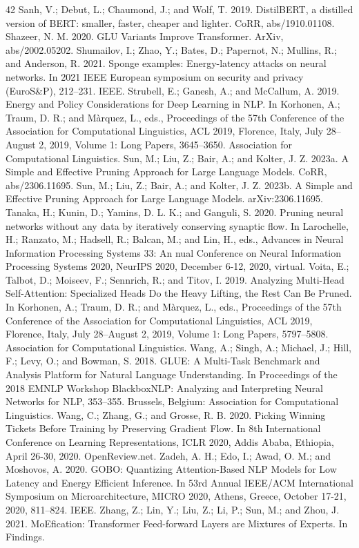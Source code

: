 \documentclass[10pt,twocolumn]{article}
\begin{document}
\begin{thebibliography}{42}
 Sanh, V.; Debut, L.; Chaumond, J.; and Wolf, T. 2019. DistilBERT, a distilled version of BERT: smaller, faster, cheaper and lighter. CoRR, abs/1910.01108.
 Shazeer, N. M. 2020. GLU Variants Improve Transformer. ArXiv, abs/2002.05202.
 Shumailov, I.; Zhao, Y.; Bates, D.; Papernot, N.; Mullins, R.; and Anderson, R. 2021. Sponge examples: Energy-latency attacks on neural networks. In 2021 IEEE European symposium on security and privacy (EuroS\&P), 212–231. IEEE.
 Strubell, E.; Ganesh, A.; and McCallum, A. 2019. Energy and Policy Considerations for Deep Learning in NLP. In Korhonen, A.; Traum, D. R.; and Màrquez, L., eds., Proceedings of the 57th Conference of the Association for Computational Linguistics, ACL 2019, Florence, Italy, July 28–August 2, 2019, Volume 1: Long Papers, 3645–3650. Association for Computational Linguistics.
 Sun, M.; Liu, Z.; Bair, A.; and Kolter, J. Z. 2023a. A Simple and Effective Pruning Approach for Large Language Models. CoRR, abs/2306.11695.
 Sun, M.; Liu, Z.; Bair, A.; and Kolter, J. Z. 2023b. A Simple and Effective Pruning Approach for Large Language Models. arXiv:2306.11695.
 Tanaka, H.; Kunin, D.; Yamins, D. L. K.; and Ganguli, S. 2020. Pruning neural networks without any data by iteratively conserving synaptic flow. In Larochelle, H.; Ranzato, M.; Hadsell, R.; Balcan, M.; and Lin, H., eds., Advances in Neural Information Processing Systems 33: An
 nual Conference on Neural Information Processing Systems 2020, NeurIPS 2020, December 6-12, 2020, virtual.
 Voita, E.; Talbot, D.; Moiseev, F.; Sennrich, R.; and Titov, I. 2019. Analyzing Multi-Head Self-Attention: Specialized Heads Do the Heavy Lifting, the Rest Can Be Pruned. In Korhonen, A.; Traum, D. R.; and Màrquez, L., eds., Proceedings of the 57th Conference of the Association for Computational Linguistics, ACL 2019, Florence, Italy, July 28–August 2, 2019, Volume 1: Long Papers, 5797–5808. Association for Computational Linguistics.
 Wang, A.; Singh, A.; Michael, J.; Hill, F.; Levy, O.; and Bowman, S. 2018. GLUE: A Multi-Task Benchmark and Analysis Platform for Natural Language Understanding. In Proceedings of the 2018 EMNLP Workshop BlackboxNLP: Analyzing and Interpreting Neural Networks for NLP, 353–355. Brussels, Belgium: Association for Computational Linguistics.
 Wang, C.; Zhang, G.; and Grosse, R. B. 2020. Picking Winning Tickets Before Training by Preserving Gradient Flow. In 8th International Conference on Learning Representations, ICLR 2020, Addis Ababa, Ethiopia, April 26-30, 2020. OpenReview.net.
 Zadeh, A. H.; Edo, I.; Awad, O. M.; and Moshovos, A. 2020. GOBO: Quantizing Attention-Based NLP Models for Low Latency and Energy Efficient Inference. In 53rd Annual IEEE/ACM International Symposium on Microarchitecture, MICRO 2020, Athens, Greece, October 17-21, 2020, 811–824. IEEE.
 Zhang, Z.; Lin, Y.; Liu, Z.; Li, P.; Sun, M.; and Zhou, J. 2021. MoEfication: Transformer Feed-forward Layers are Mixtures of Experts. In Findings.
\end{thebibliography}
\end{document}
